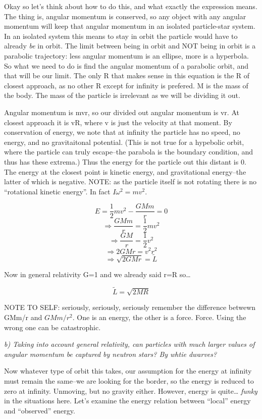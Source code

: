 \documentclass[landscape,letterpaper,10pt,english]{article}
\begin{document}
    Okay so let's think about how to do this, and what exactly the
expression means. The thing is, angular momentum is conserved, so any
object with any angular momentum will keep that angular momentum in an
isolated particle-star system. In an isolated system this means to stay
in orbit the particle would have to already \emph{be} in orbit. The
limit between being in orbit and NOT being in orbit is a parabolic
trajectory: less angular momentum is an ellipse, more is a hyperbola. So
what we need to do is find the angular momentum of a parabolic orbit,
and that will be our limit. The only R that makes sense in this equation
is the R of closest approach, as no other R except for infinity is
prefered. M is the mass of the body. The mass of the particle is
irrelevant as we will be dividing it out.

Angular momentum is mvr, so our divided out angular momentum is vr. At
closest approach it is vR, where v is just the velocity at that moment.
By conservation of energy, we note that at infinity the particle has no
speed, no energy, and no gravitaitonal potential. (This is not true for
a hypebolic orbit, where the particle can truly escape--the parabola is
the boundary condition, and thus has these extrema.) Thus the energy for
the particle out this distant is 0. The energy at the closest point is
kinetic energy, and gravitational energy--the latter of which is
negative. NOTE: as the particle itself is not rotating there is no
``rotational kinetic energy''. In fact \(I\omega^2 = mv^2\).

\[ E = \frac12 mv^2 - \frac{GMm}{r} = 0\]
\[ \Rightarrow \frac{GMm}{r} = \frac12 mv^2 \]
\[ \Rightarrow \frac{GM}{r} = \frac12 v^2 \]
\[ \Rightarrow 2GMr =  v^2r^2 \]
\[ \Rightarrow \sqrt{2GMr} = \tilde L \]

Now in general relativity G=1 and we already said r=R so\ldots{}

\[ \tilde L = \sqrt{2MR} \]

NOTE TO SELF: seriously, seriously, seriously remember the difference
betwewn GMm/r and \(GMm/r^2\). One is an energy, the other is a force.
Force. Using the wrong one can be catastrophic.

    \emph{b) Taking into account general relativity, can particles with much
larger values of angular momentum be captured by neutron stars? By whtie
dwarves?}

    Now whatever type of orbit this takes, our assumption for the energy at
infinity must remain the same--we are looking for the border, so the
energy is reduced to zero at infinity. Unmoving, but no gravity either.
However, energy is quite\ldots{} \emph{funky} in the situations here.
Let's examine the energy relation between ``local'' energy and
``observed'' energy.
\end{document}
